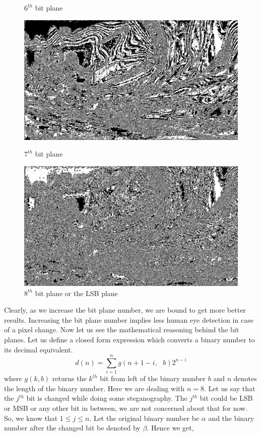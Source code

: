 \documentclass{report}
\begin{document}
\begin{figure}[H]
\begin{minipage}{0.46\linewidth}
\caption{$6^{th}$ bit plane}
\end{minipage}
\hfill
\begin{minipage}{0.46\linewidth}
\includegraphics[width=\textwidth]{images/7.png}
\caption{$7^{th}$ bit plane}
\end{minipage}
\hfill
\begin{minipage}{0.46\linewidth}
\includegraphics[width=\textwidth]{images/8.png}
\caption{$8^{th}$ bit plane or the LSB plane}
\end{minipage}

\end{figure}
Clearly, as we increase the bit plane number, we are bound to get more better results. Increasing the bit plane number implies less human eye detection in case of a pixel change. Now let us see the mathematical reasoning behind the bit planes. \newpage Let us define a closed form expression which converts a binary number to its decimal equivalent.
\begin{equation}
\displaystyle d(n) =\sum_{i=1}^{n}g(n+1-i,\textrm{ } b)2^{n-i}
\end{equation}
where $g(k, b)$ returns the $k^{th}$ bit from left of the binary number $b$ and $n$ denotes the length of the binary number. Here we are dealing with $n=8$. Let us say that the $j^{th}$ bit is changed while doing some steganography. The $j^{th}$ bit could be LSB or MSB or any other bit in between, we are not concerned about that for now. So, we know that $ 1 \leq j \leq n$. Let the original binary number be $\alpha$ and the binary number after the changed bit be denoted by $\beta$. Hence we get,
\end{document}
